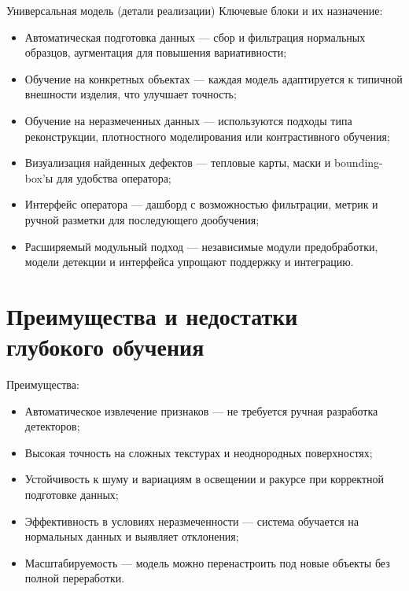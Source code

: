 \documentclass[14 pt,a4paper]{article}
\begin{document}
Универсальная модель (детали реализации)
Ключевые блоки и их назначение:
\begin{itemize}
	\item Автоматическая подготовка данных — сбор и фильтрация нормальных образцов, аугментация для повышения вариативности;
	\item Обучение на конкретных объектах — каждая модель адаптируется к типичной внешности изделия, что улучшает точность;
	\item Обучение на неразмеченных данных — используются подходы типа реконструкции, плотностного моделирования или контрастивного обучения;
	\item Визуализация найденных дефектов — тепловые карты, маски и bounding-box’ы для удобства оператора;
	\item Интерфейс оператора — дашборд с возможностью фильтрации, метрик и ручной разметки для последующего дообучения;
	\item Расширяемый модульный подход — независимые модули предобработки, модели детекции и интерфейса упрощают поддержку и интеграцию.	
\end{itemize}

\section{Преимущества и недостатки глубокого обучения}
Преимущества:
\begin{itemize}
	\item Автоматическое извлечение признаков — не требуется ручная разработка детекторов;
	\item Высокая точность на сложных текстурах и неоднородных поверхностях;
	\item Устойчивость к шуму и вариациям в освещении и ракурсе при корректной подготовке данных;
	\item Эффективность в условиях неразмеченности — система обучается на нормальных данных и выявляет отклонения;
	\item Масштабируемость — модель можно перенастроить под новые объекты без полной переработки.
\end{itemize}
	
\end{document}
